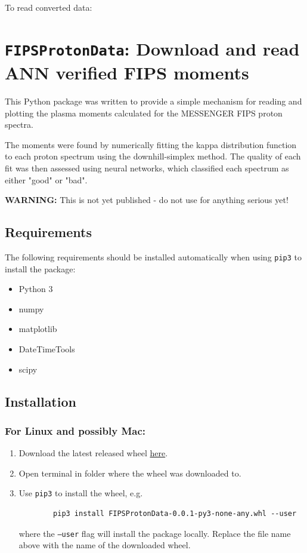 	To read converted data:
	

	\section{\texttt{FIPSProtonData}: Download and read ANN verified FIPS moments}


	This Python package was written to provide a simple mechanism for 
	reading and plotting the plasma moments calculated for the MESSENGER 
	FIPS proton spectra.
	
	The moments were found by numerically fitting the kappa distribution 
	function to each proton spectrum using the downhill-simplex method. The
	quality of each fit was then assessed using neural networks, which 
	classified each spectrum as either "good" or "bad".
	
	\textbf{WARNING:} This is not yet published - do not use for anything serious yet!
	
	\subsection{Requirements}
	The following requirements should be installed automatically when using 
	\texttt{pip3} to install the package:
	
	\begin{itemize}
		\item Python 3
		\item numpy
		\item matplotlib
		\item DateTimeTools
		\item scipy
	\end{itemize}
	
	\subsection{Installation}
	\subsubsection{For Linux and possibly Mac:}
	\begin{enumerate}
		\item Download the latest released wheel \href{https://github.com/mattkjames7/FIPSProtonData/releases/download/0.0.1/FIPSProtonData-0.0.1-py3-none-any.whl}{here}.
		\item Open terminal in folder where the wheel was downloaded to.
		\item Use \texttt{pip3} to install the wheel, e.g. 
		\begin{verbatim}
		pip3 install FIPSProtonData-0.0.1-py3-none-any.whl --user
		\end{verbatim}
		where the \texttt{--user} flag will install the package locally. Replace 
		the file name above with the name of the downloaded wheel.
	\end{enumerate}
	
